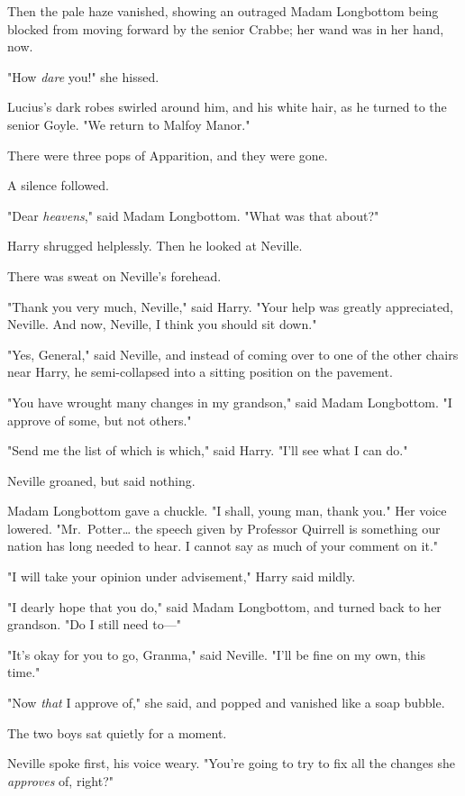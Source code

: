 Then the pale haze vanished, showing an outraged Madam Longbottom being blocked
from moving forward by the senior Crabbe; her wand was in her hand, now.

"How \emph{dare} you!" she hissed.

Lucius's dark robes swirled around him, and his white hair, as he turned to the
senior Goyle. "We return to Malfoy Manor."

There were three pops of Apparition, and they were gone.

A silence followed.

"Dear \emph{heavens}," said Madam Longbottom. "What was that about?"

Harry shrugged helplessly. Then he looked at Neville.

There was sweat on Neville's forehead.

"Thank you very much, Neville," said Harry. "Your help was greatly appreciated,
Neville. And now, Neville, I think you should sit down."

"Yes, General," said Neville, and instead of coming over to one of the other
chairs near Harry, he semi-collapsed into a sitting position on the pavement.

"You have wrought many changes in my grandson," said Madam Longbottom. "I
approve of some, but not others."

"Send me the list of which is which," said Harry. "I'll see what I can do."

Neville groaned, but said nothing.

Madam Longbottom gave a chuckle. "I shall, young man, thank you." Her voice
lowered. "Mr.~Potter{\ldots} the speech given by Professor Quirrell is
something our nation has long needed to hear. I cannot say as much of your
comment on it."

"I will take your opinion under advisement," Harry said mildly.

"I dearly hope that you do," said Madam Longbottom, and turned back to her
grandson. "Do I still need to---"

"It's okay for you to go, Granma," said Neville. "I'll be fine on my own, this
time."

"Now \emph{that} I approve of," she said, and popped and vanished like a soap
bubble.

The two boys sat quietly for a moment.

Neville spoke first, his voice weary. "You're going to try to fix all the
changes she \emph{approves} of, right?"

